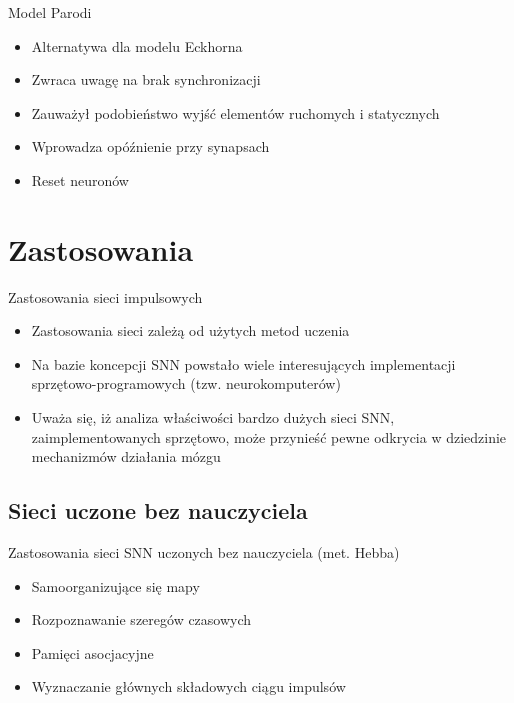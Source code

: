 \documentclass{beamer}
\begin{document}
\begin{frame}{Model Parodi}
\begin{itemize}
\item Alternatywa dla modelu Eckhorna
\item Zwraca uwagę na brak synchronizacji
\item Zauważył podobieństwo wyjść elementów ruchomych i statycznych
\item Wprowadza opóźnienie przy synapsach
\item Reset neuronów
\end{itemize}
\end{frame}

\section{Zastosowania}

\begin{frame}{Zastosowania sieci impulsowych}

\begin{itemize}
\item Zastosowania sieci zależą od użytych metod uczenia
\item Na bazie koncepcji SNN powstało wiele interesujących implementacji sprzętowo-programowych (tzw. neurokomputerów)
\item Uważa się, iż analiza właściwości bardzo dużych sieci SNN, zaimplementowanych sprzętowo, może przynieść pewne odkrycia w dziedzinie mechanizmów działania mózgu
\end{itemize}

\end{frame}

\subsection{Sieci uczone bez nauczyciela}

\begin{frame}{Zastosowania sieci SNN uczonych bez nauczyciela (met. Hebba)}

\begin{itemize}
\item Samoorganizujące się mapy
\item Rozpoznawanie szeregów czasowych 
\item Pamięci asocjacyjne
\item Wyznaczanie głównych składowych ciągu impulsów
\end{itemize}

\end{frame}
\end{document}
